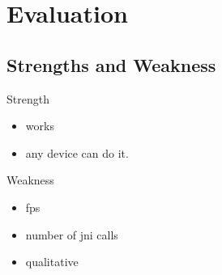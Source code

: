 \section{Evaluation}
\subsection{Strengths and Weakness}
Strength
\begin{itemize}
\item works
\item any device can do it.
\end{itemize}
Weakness
\begin{itemize}
\item fps
\item number of jni calls
\item qualitative
\end{itemize}